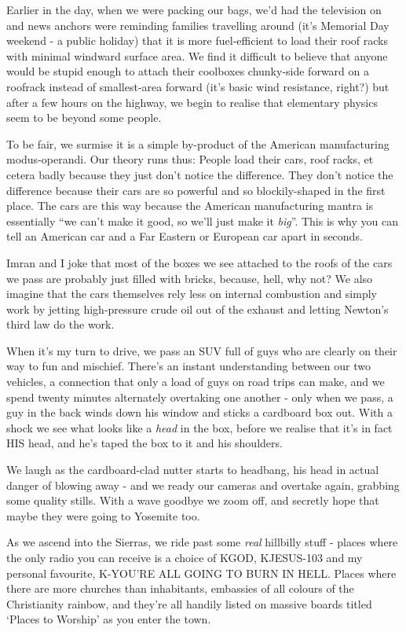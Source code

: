 \documentclass[a5paper,titlepage,11pt]{book}
\begin{document}
Earlier in the day, when we were packing our bags, we'd had the television on and news anchors were reminding families travelling around (it's Memorial Day weekend - a public holiday) that it is more fuel-efficient to load their roof racks with minimal windward surface area.  We find it difficult to believe that anyone would be stupid enough to attach their coolboxes chunky-side forward on a roofrack instead of smallest-area forward (it's basic wind resistance, right?) but after a few hours on the highway, we begin to realise that elementary physics seem to be beyond some people.

To be fair, we surmise it is a simple by-product of the American manufacturing modus-operandi.  Our theory runs thus:  People load their cars, roof racks, et cetera badly because they just don't notice the difference.  They don't notice the difference because their cars are so powerful and so blockily-shaped in the first place.  The cars are this way because the American manufacturing mantra is essentially ``we can't make it good, so we'll just make it \emph{big}''.  This is why you can tell an American car and a Far Eastern or European car apart in seconds.

Imran and I joke that most of the boxes we see attached to the roofs of the cars we pass are probably just filled with bricks, because, hell, why not?  We also imagine that the cars themselves rely less on internal combustion and simply work by jetting high-pressure crude oil out of the exhaust and letting Newton's third law do the work.

When it's my turn to drive, we pass an SUV full of guys who are clearly on their way to fun and mischief.  There's an instant understanding between our two vehicles, a connection that only a load of guys on road trips can make, and we spend twenty minutes alternately overtaking one another - only when we pass, a guy in the back winds down his window and sticks a cardboard box out.  With a shock we see what looks like a \emph{head} in the box, before we realise that it's in fact HIS head, and he's taped the box to it and his shoulders.

We laugh as the cardboard-clad nutter starts to headbang, his head in actual danger of blowing away - and we ready our cameras and overtake again, grabbing some quality stills.  With a wave goodbye we zoom off, and secretly hope that maybe they were going to Yosemite too.

As we ascend into the Sierras, we ride past some \emph{real} hillbilly stuff - places where the only radio you can receive is a choice of KGOD, KJESUS-103 and my personal favourite, K-YOU'RE ALL GOING TO BURN IN HELL.  Places where there are more churches than inhabitants, embassies of all colours of the Christianity rainbow, and they're all handily listed on massive boards titled `Places to Worship' as you enter the town.
\end{document}
